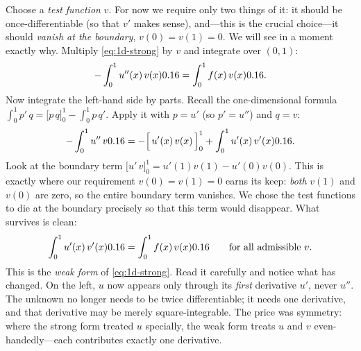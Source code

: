 Choose a \emph{test function} $v$. For now we require only two things of it: it
should be once-differentiable (so that $v'$ makes sense), and---this is the
crucial choice---it should \emph{vanish at the boundary}, $v(0)=v(1)=0$. We will
see in a moment exactly why. Multiply \cref{eq:1d-strong} by $v$ and integrate
over $(0,1)$:
\begin{equation}
  -\int_0^1 u''(x)\,v(x)0.16 = \int_0^1 f(x)\,v(x)0.16.
  \label{eq:1d-weighted}
\end{equation}
Now integrate the left-hand side by parts. Recall the one-dimensional formula
$\int_0^1 p'\,q = \bigl[p\,q\bigr]_0^1 - \int_0^1 p\,q'$. Apply it with $p=u'$
(so $p'=u''$) and $q=v$:
\begin{equation}
  -\int_0^1 u''\,v0.16
  = -\Bigl[\,u'(x)\,v(x)\,\Bigr]_0^1 + \int_0^1 u'(x)\,v'(x)0.16.
  \label{eq:1d-ibp}
\end{equation}
Look at the boundary term $\bigl[u'\,v\bigr]_0^1 = u'(1)v(1) - u'(0)v(0)$. This
is exactly where our requirement $v(0)=v(1)=0$ earns its keep: \emph{both}
$v(1)$ and $v(0)$ are zero, so the entire boundary term vanishes. We chose the
test functions to die at the boundary precisely so that this term would
disappear. What survives is clean:
\begin{equation}
  \int_0^1 u'(x)\,v'(x)0.16 = \int_0^1 f(x)\,v(x)0.16
  \qquad\text{for all admissible } v.
  \label{eq:1d-weak}
\end{equation}
This is the \emph{weak form} of \cref{eq:1d-strong}. Read it carefully and
notice what has changed. On the left, $u$ now appears only through its
\emph{first} derivative $u'$, never $u''$. The unknown no longer needs to be
twice differentiable; it needs one derivative, and that derivative may be
merely square-integrable. The price was symmetry: where the strong form treated
$u$ specially, the weak form treats $u$ and $v$ even-handedly---each contributes
exactly one derivative.

